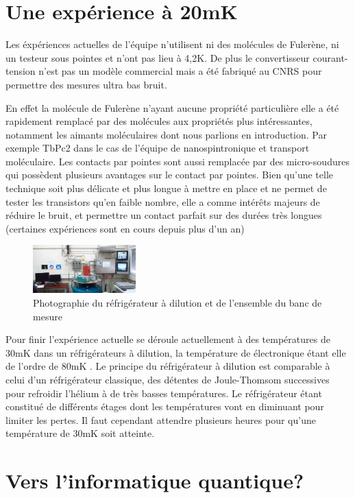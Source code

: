 \section{Une expérience à 20mK}
Les éxpériences actuelles de l’équipe n’utilisent ni des molécules de Fulerène, ni un testeur sous pointes et n’ont pas lieu à 4,2K. De plus le convertisseur courant-tension n’est pas un modèle commercial mais a été fabriqué au CNRS pour permettre des mesures ultra bas bruit.

En effet la molécule de Fulerène n’ayant aucune propriété particulière elle a été rapidement remplacé par des molécules aux propriétés plus intéressantes, notamment les aimants moléculaires dont nous parlions en introduction. Par exemple TbPc2 dans le cas de l’équipe de nanospintronique et transport moléculaire.
Les contacts par pointes sont aussi remplacée par des micro-soudures qui possèdent plusieurs avantages sur le contact par pointes. Bien qu’une telle technique soit plus délicate et plus longue à mettre en place et ne permet de tester les transistors qu’en faible nombre, elle a comme intérêts majeurs de réduire le bruit, et permettre un contact parfait sur des durées très longues (certaines expériences sont en cours depuis plus d’un an)

\begin{figure}[h]
    \begin{center}
        \includegraphics[width=150px]{Photos/Refrigerateur_Dillution.png}
        \caption{Photographie du réfrigérateur à dilution et de l’ensemble du banc de mesure}
        \label{fig:}
    \end{center}
\end{figure}

Pour finir l’expérience actuelle se déroule actuellement à des températures de 30mK dans un réfrigérateurs à dilution, la température de électronique étant elle de l’ordre de 80mK \cite{10}. Le principe du réfrigérateur à dilution est comparable à celui d’un réfrigérateur classique, des détentes de Joule-Thomsom successives pour refroidir l’hélium à de très basses températures. Le réfrigérateur étant constitué de différents étages dont les températures vont en diminuant pour limiter les pertes. Il faut cependant attendre plusieurs heures pour qu’une température de 30mK soit atteinte.
\section{Vers l'informatique quantique?}

